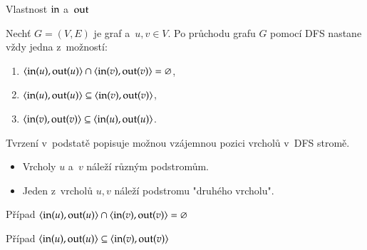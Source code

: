 \documentclass[11pt,professionalfont,aspectratio=43]{beamer}
\begin{document}
    \begin{frame}{Vlastnost $\operatorname{in}$ a~$\operatorname{out}$}
        \begin{propblock}
            Nechť $G=(V,E)$ je graf a~$u,v\in V$. Po průchodu grafu $G$ pomocí DFS nastane vždy jedna z~možností:
            \begin{enumerate}
                \item $\langle \operatorname{in}(u),\operatorname{out}(u)\rangle\cap\langle \operatorname{in}(v),\operatorname{out}(v)\rangle = \varnothing$,
                \item $\langle \operatorname{in}(u),\operatorname{out}(u)\rangle\subseteq\langle \operatorname{in}(v),\operatorname{out}(v)\rangle$,
                \item $\langle \operatorname{in}(v),\operatorname{out}(v)\rangle\subseteq\langle \operatorname{in}(u),\operatorname{out}(u)\rangle$.
            \end{enumerate}
        \end{propblock}
        Tvrzení v~podstatě popisuje možnou vzájemnou pozici vrcholů v~DFS stromě.
        \begin{itemize}
            \item {} Vrcholy $u$ a~$v$ náleží různým podstromům.
            \item {} Jeden z~vrcholů $u,v$ náleží podstromu "druhého vrcholu".
        \end{itemize}
    \end{frame}

    \begin{frame}{Případ $\langle \operatorname{in}(u),\operatorname{out}(u)\rangle\cap\langle \operatorname{in}(v),\operatorname{out}(v)\rangle = \varnothing$}
    \end{frame}

    \begin{frame}{Případ $\langle \operatorname{in}(u),\operatorname{out}(u)\rangle\subseteq\langle \operatorname{in}(v),\operatorname{out}(v)\rangle$}
    \end{frame}
\end{document}
